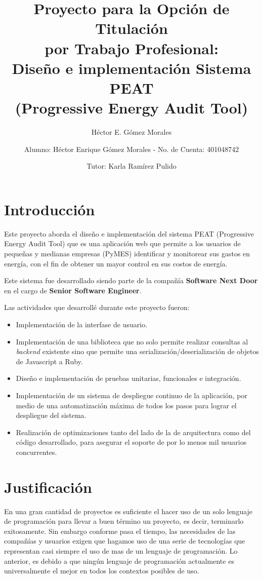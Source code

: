 \documentclass{article}
\author{Héctor E. Gómez Morales}
\title{Proyecto para la Opción de Titulación\\
  por Trabajo Profesional:\\
  Diseño e implementación Sistema PEAT\\
  (Progressive Energy Audit Tool)}
\begin{document}
\author{ Alumno: Héctor Enrique Gómez Morales - No. de Cuenta: 401048742 \and
  Tutor: Karla Ramírez Pulido}
\maketitle
\section{Introducción}
Este proyecto aborda el diseño e implementación del sistema
PEAT (Progressive Energy Audit Tool) que es una aplicación web que
permite a los usuarios de pequeñas y medianas empresas (PyMES)
identificar y monitorear sus gastos en energía, con el fin de obtener
un mayor control en sus costos de energía.

Este sistema fue desarrollado siendo parte de la compañía
\textbf{Software Next Door} en el cargo de \textbf{Senior Software Engineer}.

Las actividades que desarrollé durante este proyecto fueron:
\begin{itemize}
\item Implementación de la interfase de usuario.
\item Implementación de una biblioteca que no solo permite realizar consultas
  al \textit{backend} existente sino que permite una serialización/deserialización
  de objetos de Javascript a Ruby.
\item Diseño e implementación de pruebas unitarias, funcionales e integración.
\item Implementación de un sistema de despliegue continuo de la aplicación, por
  medio de una automatización máxima de todos los pasos para lograr el despliegue
  del sistema.
\item Realización de optimizaciones tanto del lado de la de arquitectura como
  del código desarrollado, para asegurar el soporte de por lo menos mil usuarios concurrentes.
\end{itemize}

\section{Justificación}
En una gran cantidad de proyectos es suficiente
el hacer uso de un solo lenguaje de programación para llevar a buen
término un proyecto, es decir, terminarlo exitosamente.
Sin embargo conforme pasa el tiempo, las necesidades
de las compañías y usuarios exigen que hagamos uso de una serie de
tecnologías que representan casi siempre el uso de mas de un lenguaje
de programación. Lo anterior, es debido a que ningún lenguaje de programación
actualmente es universalmente el mejor en todos los contextos posibles de uso.
\end{document}

